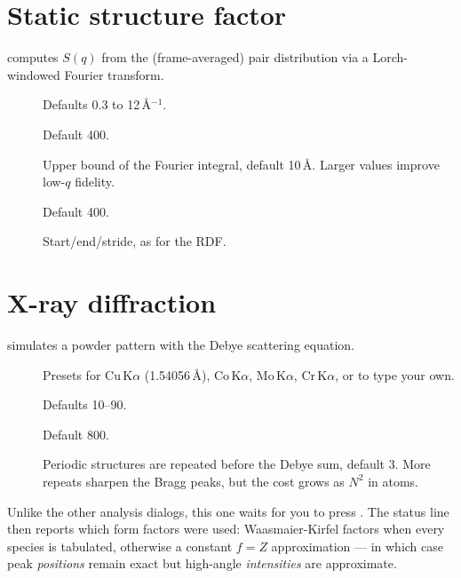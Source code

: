 \section{Static structure factor}

\menusep{} computes $S(q)$ from
the (frame-averaged) pair distribution via a Lorch-windowed Fourier
transform.

\begin{description}
  \item[] Defaults 0.3 to 12\,\AA$^{-1}$.
  \item[] Default 400.
  \item[] Upper bound of the Fourier integral, default
    10\,\AA{}. Larger values improve low-$q$ fidelity.
  \item[] Default 400.
  \item[] Start/end/stride, as for the RDF.
\end{description}

\section{X-ray diffraction}

\menusep{} simulates a powder
pattern with the Debye scattering equation.

\begin{description}
  \item[] Presets for Cu\,K$\alpha$ (1.54056\,\AA),
    Co\,K$\alpha$, Mo\,K$\alpha$, Cr\,K$\alpha$, or  to type
    your own.
  \item[] Defaults 10--90\textdegree.
  \item[] Default 800.
  \item[] Periodic structures are repeated before the
    Debye sum, default 3. More repeats sharpen the Bragg peaks, but the
    cost grows as $N^2$ in atoms.
\end{description}

Unlike the other analysis dialogs, this one waits for you to press
. The status line then reports which form factors were used:
Waasmaier-Kirfel factors when every species is tabulated, otherwise a
constant $f = Z$ approximation --- in which case peak \emph{positions}
remain exact but high-angle \emph{intensities} are approximate.

